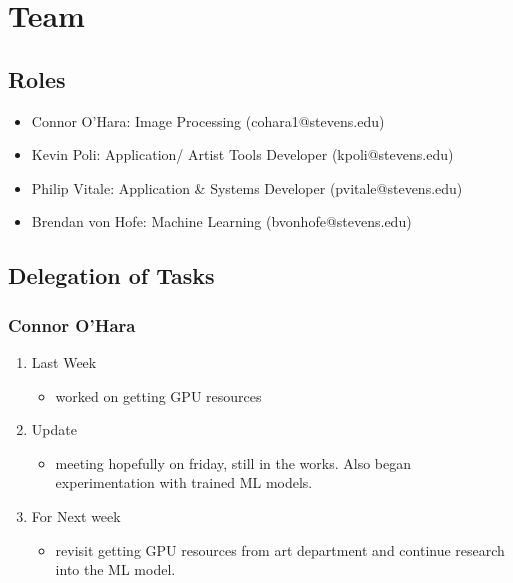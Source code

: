 \documentclass[15pt]{article}
\begin{document}
\section{Team}
\label{sec:orgfe8ede7}
\subsection{Roles}
\label{sec:org70817ae}
\begin{itemize}
\item Connor O’Hara: Image Processing (cohara1@stevens.edu)
\item Kevin Poli: Application/ Artist Tools Developer (kpoli@stevens.edu)
\item Philip Vitale: Application \& Systems Developer (pvitale@stevens.edu)
\item Brendan von Hofe: Machine Learning (bvonhofe@stevens.edu)
\end{itemize}



\subsection{Delegation of Tasks}
\label{sec:orgfbfdd38}

\subsubsection{Connor O’Hara}
\label{sec:org1eb55be}
\begin{enumerate}
\item Last Week
\label{sec:org5d047d0}
\begin{itemize}
\item worked on getting GPU resources
\end{itemize}
\item Update
\label{sec:orgb027c37}
\begin{itemize}
\item meeting hopefully on friday, still in the works. Also began experimentation with trained ML models.
\end{itemize}
\item For Next week
\label{sec:orga30c227}
\begin{itemize}
\item revisit getting GPU resources from art department and continue research into the ML model.
\end{itemize}
\end{enumerate}
\end{document}
